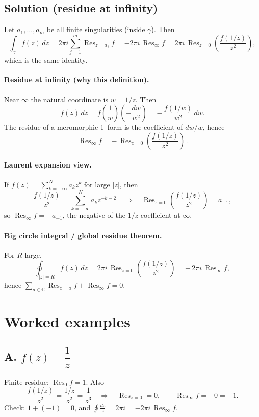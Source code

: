 \documentclass[12pt,a4paper]{article}
\DeclareMathOperator{\Res}{Res}
\begin{document}
	\subsection*{Solution (residue at infinity)}
	Let \(a_1,\dots,a_m\) be all finite singularities (inside \(\gamma\)).
	Then
	\[
	\int_{\gamma} f(z)\,dz
	=2\pi i\sum_{j=1}^{m}\operatorname{Res}_{z=a_j} f
	= -2\pi i\,\operatorname{Res}_{\infty} f
	= 2\pi i\,\operatorname{Res}_{z=0}\!\left(\frac{f(1/z)}{z^{2}}\right),
	\]
	which is the same identity.
	
	\paragraph{Residue at infinity (why this definition).}
	Near \(\infty\) the natural coordinate is \(w=1/z\).
	Then
	\[
	f(z)\,dz = f\!\left(\frac1w\right)\!\left(-\frac{dw}{w^2}\right)
	= -\,\frac{f(1/w)}{w^2}\,dw .
	\]
	The residue of a meromorphic 1\,-form is the coefficient of \(dw/w\),
	hence
	\[
	\boxed{\ \operatorname{Res}_{\infty} f
		= -\,\operatorname{Res}_{z=0}\!\left(\frac{f(1/z)}{z^{2}}\right)\ }.
	\]
	
	\paragraph{Laurent expansion view.}
	If \(f(z)=\sum_{k=-\infty}^{N} a_k z^{k}\) for large \(|z|\),
	then
	\[
	\frac{f(1/z)}{z^2}=\sum_{k=-\infty}^{N} a_k z^{-k-2}
	\quad\Rightarrow\quad
	\operatorname{Res}_{z=0}\!\left(\frac{f(1/z)}{z^2}\right)=a_{-1},
	\]
	so \(\operatorname{Res}_{\infty} f=-a_{-1}\), the negative of the \(1/z\) coefficient at \(\infty\).
	
	\paragraph{Big circle integral / global residue theorem.}
	For \(R\) large,
	\[
	\oint_{|z|=R} f(z)\,dz
	= 2\pi i\,\operatorname{Res}_{z=0}\!\left(\frac{f(1/z)}{z^{2}}\right)
	= -\,2\pi i\,\operatorname{Res}_{\infty} f,
	\]
	hence \(\sum_{a\in\mathbb C}\operatorname{Res}_{z=a} f+\operatorname{Res}_{\infty} f=0\).
	
	\section*{Worked examples}
	
	\subsection*{A. $f(z)=\dfrac{1}{z}$}
	Finite residue: $\Res_{0} f=1$. Also
	\[
	\frac{f(1/z)}{z^2}=\frac{1/z}{z^2}=\frac{1}{z^3}\quad\Rightarrow\quad
	\Res_{z=0}=0,
	\qquad
	\boxed{\Res_{\infty} f=-0=-1}.
	\]
	Check: $1+(-1)=0$, and $\displaystyle \oint \frac{dz}{z}=2\pi i=-2\pi i\,\Res_\infty f$.
	
\end{document}
